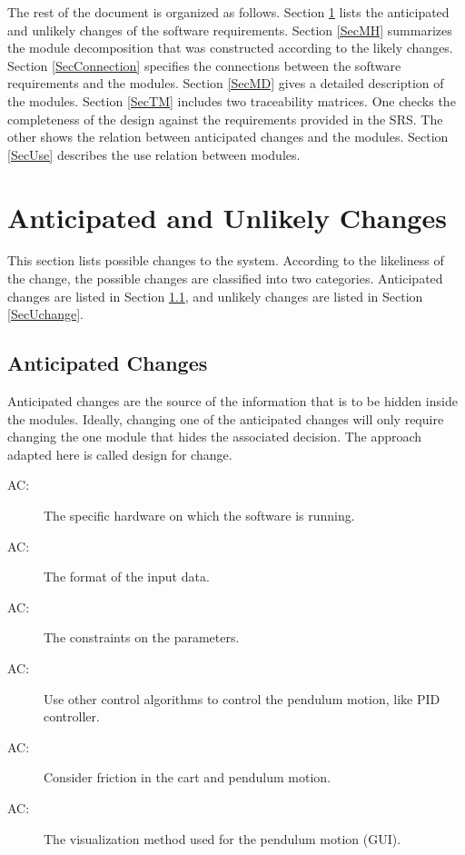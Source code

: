 \documentclass[12pt, titlepage]{article}
\newcounter{acnum}
\newcommand{\actheacnum}{AC\theacnum}
\begin{document}
The rest of the document is organized as follows. Section
\ref{SecChange} lists the anticipated and unlikely changes of the software
requirements. Section \ref{SecMH} summarizes the module decomposition that
was constructed according to the likely changes. Section \ref{SecConnection}
specifies the connections between the software requirements and the
modules. Section \ref{SecMD} gives a detailed description of the
modules. Section \ref{SecTM} includes two traceability matrices. One checks
the completeness of the design against the requirements provided in the SRS. The
other shows the relation between anticipated changes and the modules. Section
\ref{SecUse} describes the use relation between modules.

\section{Anticipated and Unlikely Changes} \label{SecChange}

This section lists possible changes to the system. According to the likeliness
of the change, the possible changes are classified into two
categories. Anticipated changes are listed in Section \ref{SecAchange}, and
unlikely changes are listed in Section \ref{SecUchange}.

\subsection{Anticipated Changes} \label{SecAchange}

Anticipated changes are the source of the information that is to be hidden
inside the modules. Ideally, changing one of the anticipated changes will only
require changing the one module that hides the associated decision. The approach
adapted here is called design for
change.

\begin{description}
\item[ \actheacnum \label{acHardware}:] The specific
  hardware on which the software is running.
\item[ \actheacnum \label{acInputFormat}:] The format 
      of the input data.
\item[ \actheacnum \label{acConstraint}:] The constraints 
     on the parameters.
\item[ \actheacnum \label{acControlAlgo}:] Use other control 
      algorithms to control the pendulum motion, like PID controller.
\item[ \actheacnum \label{acFriction}:] Consider friction 
      in the cart and pendulum motion.
\item[ \actheacnum \label{acGUI}:] The visualization method 
      used for the pendulum motion (GUI).
\end{description}
\end{document}
